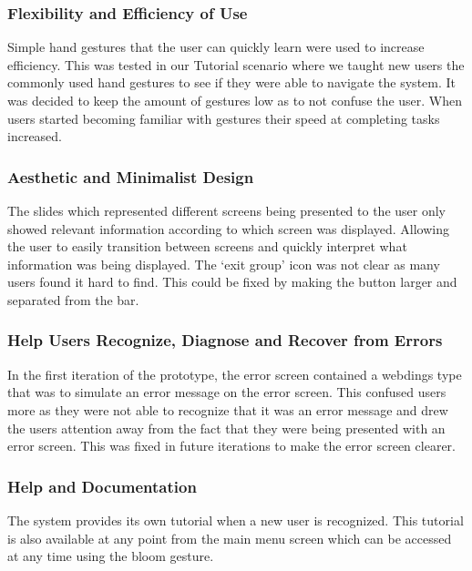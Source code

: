 \documentclass{article}
\begin{document}
            \newpage

            \subsubsection{Flexibility and Efficiency of Use}
                Simple hand gestures that the user can quickly learn were used to increase 
                efficiency. This was tested in our Tutorial scenario where we taught new 
                users the commonly used hand gestures to see if they were able to navigate the system. 
                It was decided to keep the amount of gestures low as to not confuse the user.
                When users started becoming familiar with gestures their speed at completing tasks increased.

            \subsubsection{Aesthetic and Minimalist Design}
                The slides which represented different screens being presented to the user only 
                showed relevant information according to which screen was displayed. Allowing the 
                user to easily transition between screens and quickly interpret what information 
                was being displayed. The ‘exit group’ icon was not clear as many users found it hard 
                to find. This could be fixed by making the button larger and separated from the bar.

            \subsubsection{Help Users Recognize, Diagnose and Recover from Errors}
                In the first iteration of the prototype, the error screen contained a webdings 
                type that was to simulate an error message on the error screen. 
                This confused users more as they were not able to recognize that it was an error 
                message and drew the users attention away from the fact that they were being presented 
                with an error screen. This was fixed in future iterations to make the error screen clearer.

            \subsubsection{Help and Documentation}
                The system provides its own tutorial when a new user is recognized. 
                This tutorial is also available at any point from the main menu screen 
                which can be accessed at any time using the bloom gesture.
\end{document}
